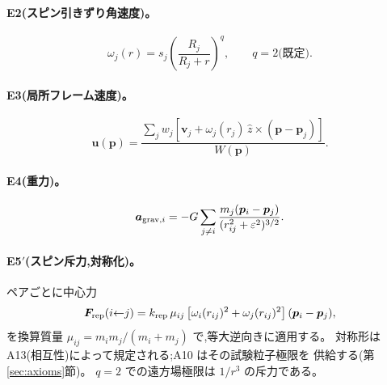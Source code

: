 \documentclass[a4paper,10pt,twocolumn]{ltjsarticle}
\newcommand{\vect}[1]{\bm{#1}}
\begin{document}
\paragraph*{E2(スピン引きずり角速度)。}
\begin{equation}
\omega_j(r) = s_j\left(\frac{R_j}{R_j+r}\right)^{q},\qquad
q = 2 \text{(既定)}.
\label{eq:E2}
\end{equation}

\paragraph*{E3(局所フレーム速度)。}
\begin{equation}
\vect{u}(\vect{p}) =
\frac{\sum_j w_j\left[\vect{v}_j
 + \omega_j(r_j)\,\hat{z}\times(\vect{p}-\vect{p}_j)\right]}
{W(\vect{p})}.
\label{eq:E3}
\end{equation}

\paragraph*{E4(重力)。}
\begin{equation}
\vect{a}_{{\rm grav},i} =
 -G\sum_{j\ne i} \frac{m_j(\vect{p}_i-\vect{p}_j)}
 {(r_{ij}^2+\varepsilon^2)^{3/2}}.
\label{eq:E4}
\end{equation}

\paragraph*{E5$'$(スピン斥力,対称化)。}
ペアごとに中心力
\begin{equation}
\vect{F}_{{\rm rep}}(i{\leftarrow}j) =
 k_{\rm rep}\,\mu_{ij}
 \left[\omega_i(r_{ij})^2+\omega_j(r_{ij})^2\right]
 (\vect{p}_i-\vect{p}_j),
\label{eq:E5}
\end{equation}
を換算質量 $\mu_{ij} = m_im_j/(m_i+m_j)$ で,等大逆向きに適用する。
対称形は A13(相互性)によって規定される;A10 はその試験粒子極限を
供給する(第\ref{sec:axioms}節)。
$q=2$ での遠方場極限は $1/r^3$ の斥力である。
\end{document}
